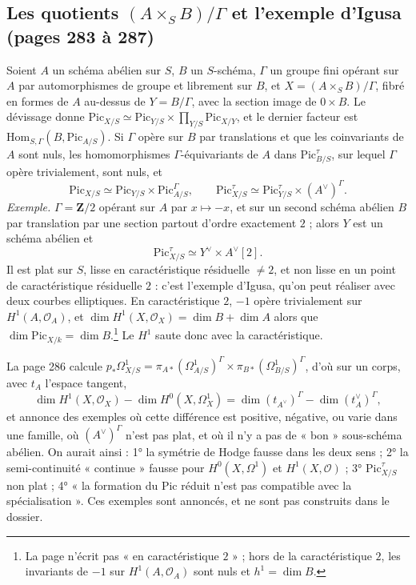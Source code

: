 \documentclass[11pt,a4paper]{article}
\begin{document}
\subsection*{Les quotients $(A \times_S B)/\Gamma$ et l'exemple d'Igusa (pages 283 à 287)}

Soient $A$ un schéma abélien sur $S$, $B$ un $S$-schéma, $\Gamma$ un groupe
fini opérant sur $A$ par automorphismes de groupe et librement sur $B$, et
$X = (A \times_S B)/\Gamma$, fibré en formes de $A$ au-dessus de $Y = B/\Gamma$,
avec la section image de $0 \times B$. Le dévissage donne
$\mathrm{Pic}_{X/S} \simeq \mathrm{Pic}_{Y/S} \times \prod_{Y/S}\mathrm{Pic}_{X/Y}$,
et le dernier facteur est $\mathrm{Hom}_{S,\Gamma}(B, \mathrm{Pic}_{A/S})$. Si
$\Gamma$ opère sur $B$ par translations et que les coinvariants de $A$ sont
nuls, les homomorphismes $\Gamma$-équivariants de $A$ dans
$\mathrm{Pic}^\tau_{B/S}$, sur lequel $\Gamma$ opère trivialement, sont nuls, et
\[
\mathrm{Pic}_{X/S} \simeq \mathrm{Pic}_{Y/S} \times \mathrm{Pic}_{A/S}^{\Gamma}, \qquad
\mathrm{Pic}^\tau_{X/S} \simeq \mathrm{Pic}^\tau_{Y/S} \times (A^\vee)^{\Gamma} .
\]
\emph{Exemple.} $\Gamma = \mathbf{Z}/2$ opérant sur $A$ par $x \mapsto -x$, et sur
un second schéma abélien $B$ par translation par une section partout d'ordre
exactement $2$ ; alors $Y$ est un schéma abélien et
\[
\mathrm{Pic}^\tau_{X/S} \simeq Y^\vee \times A^\vee[2] .
\]
Il est plat sur $S$, lisse en caractéristique résiduelle $\neq 2$, et non lisse
en un point de caractéristique résiduelle $2$ : c'est l'exemple d'Igusa, qu'on
peut réaliser avec deux courbes elliptiques. En caractéristique $2$, $-1$
opère trivialement sur $H^1(A, \mathcal{O}_A)$, et
$\dim H^1(X, \mathcal{O}_X) = \dim B + \dim A$ alors que
$\dim \mathrm{Pic}_{X/k} = \dim B$.\footnote{La page n'écrit pas « en
caractéristique $2$ » ; hors de la caractéristique $2$, les invariants de $-1$
sur $H^1(A, \mathcal{O}_A)$ sont nuls et $h^1 = \dim B$.} Le $H^1$ saute donc
avec la caractéristique.

La page 286 calcule
$p_*\Omega^1_{X/S} = \pi_{A*}(\Omega^1_{A/S})^\Gamma \times \pi_{B*}(\Omega^1_{B/S})^\Gamma$,
d'où sur un corps, avec $t_A$ l'espace tangent,
\[
\dim H^1(X, \mathcal{O}_X) - \dim H^0(X, \Omega^1_X) = \dim (t_{A^\vee})^\Gamma - \dim (t_A^\vee)^\Gamma ,
\]
et annonce des exemples où cette différence est positive, négative, ou varie
dans une famille, où $(A^\vee)^\Gamma$ n'est pas plat, et où il n'y a pas de
« bon » sous-schéma abélien. On aurait ainsi : 1° la symétrie de Hodge fausse
dans les deux sens ; 2° la semi-continuité « continue » fausse pour
$H^0(X, \Omega^1)$ et $H^1(X, \mathcal{O})$ ; 3° $\mathrm{Pic}^\tau_{X/S}$ non
plat ; 4° « la formation du Pic réduit n'est pas compatible avec la
spécialisation ». Ces exemples sont annoncés, et ne sont pas construits dans le
dossier.
\end{document}
